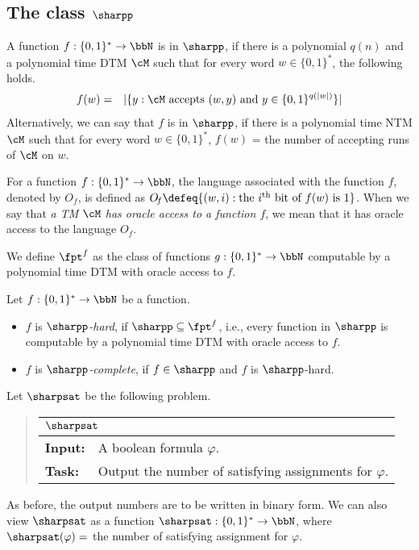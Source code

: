 \documentclass[11pt, a4paper]{article}
\begin{document}
\subsection{The class $\sharpp$}
\label{subsec:sharp-p}


\begin{definition}
A function $f:\{0,1\}^* \to \bbN$ is in $\sharpp$,
if there is a polynomial $q(n)$ and a polynomial time DTM $\cM$
such that for every word $w\in \{0,1\}^*$, the following holds.
\begin{eqnarray*}
f(w) & = & |\{y : \cM \ \text{accepts} \ (w,y)\ \text{and} \ y \in \{0,1\}^{q(|w|)}\}|
\end{eqnarray*}
Alternatively, we can say that $f$ is in $\sharpp$, if there is a polynomial time NTM $\cM$ such that
for every word $w\in \{0,1\}^*$,
$f(w)$ =  the number of accepting runs of $\cM$ on $w$.
\end{definition}

For a function $f:\{0,1\}^*\to\bbN$, the language associated with the function $f$,
denoted by $O_f$, is defined as
$O_{\! f} \defeq \{(w,i) : \text{the}\ i^{\textrm{th}}\ \text{bit of}\ f(w)\ \text{is}\ 1\}$.
When we say that {\em a TM $\cM$ has oracle access to a function $f$},
we mean that it has oracle access to the language $O_{\! f}$.

We define $\fpt^f$ as the class of functions $g:\{0,1\}^*\to\bbN$
computable by a polynomial time DTM with oracle access to $f$.

\begin{definition}
Let $f:\{0,1\}^*\to \bbN$ be a function.
\begin{itemize}
\item
$f$ is {\em $\sharpp$-hard}, if $\sharpp \subseteq \fpt^f$, i.e., 
every function in $\sharpp$ is computable by a polynomial time DTM with oracle access to $f$.
\item
$f$ is {\em $\sharpp$-complete}, if $f\in \sharpp$ and $f$ is $\sharpp$-hard.
\end{itemize}
\end{definition}

Let $\sharpsat$ be the following problem.
\begin{quote}
{\def\arraystretch{1.25}
\begin{tabular}{|ll|}
\hline
\multicolumn{2}{|l|}{$\sharpsat$}
\\
\hline
{\bf Input:}
&
A boolean formula $\varphi$.
\\
{\bf Task:}
&
Output the number of satisfying assignments for $\varphi$.
\\
\hline
\end{tabular}}
\end{quote}
As before, the output numbers are to be written in binary form.
We can also view $\sharpsat$ as a function $\sharpsat:\{0,1\}^*\to\bbN$,
where $\sharpsat(\varphi)=$ the number of satisfying assignment for $\varphi$.
\end{document}
